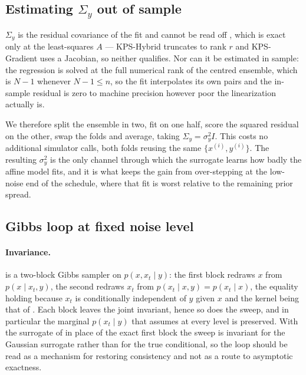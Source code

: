 \subsection{Estimating \texorpdfstring{$\Sigma_y$}{Sigma y} out of sample}
\label{appendice:sigma_estimation}

$\Sigma_y$ is the residual covariance of the fit and cannot be read off , which is
exact only at the least-squares $A$ --- KPS-Hybrid truncates to rank $r$ and KPS-Gradient uses a
Jacobian, so neither qualifies. Nor can it be estimated in sample: the regression is solved at
the full numerical rank of the centred ensemble, which is $N - 1$ whenever $N - 1 \le n$, so the
fit interpolates its own pairs and the in-sample residual is zero to machine precision however
poor the linearization actually is.

We therefore split the ensemble in two, fit on one half, score the squared residual on the other,
swap the folds and average, taking $\Sigma_y = \sigma_y^{2}I$. This costs no additional simulator
calls, both folds reusing the same $\{x^{(i)}, y^{(i)}\}$. The resulting $\sigma_y^{2}$ is the
only channel through which the surrogate learns how badly the affine model fits, and it is what
keeps the gain from over-stepping at the low-noise end of the schedule, where that fit is worst
relative to the remaining prior spread.

\subsection{Gibbs loop at fixed noise level} \label{appendice:gibbs}

\paragraph{Invariance.} \label{appendice:gibbs_invariance}
 is a two-block Gibbs sampler on $p(x, x_t \mid y)$: the first block
redraws $x$ from $p(x \mid x_t, y)$, the second redraws $x_t$ from
$p(x_t \mid x, y) = p(x_t \mid x)$, the equality holding because $x_t$ is conditionally
independent of $y$ given $x$ and the kernel being that of
. Each block leaves the joint invariant, hence so does the
sweep, and in particular the marginal $p(x_t \mid y)$ that  assumes at
every level is preserved. With the surrogate of  in place of the exact first
block the sweep is invariant for the Gaussian surrogate rather than for the true conditional, so
the loop should be read as a mechanism for restoring consistency and not as a route to asymptotic
exactness.


